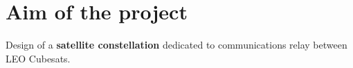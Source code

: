 \section{Aim of the project}
Design of a \textbf{satellite constellation} dedicated to  communications relay between LEO Cubesats. 
